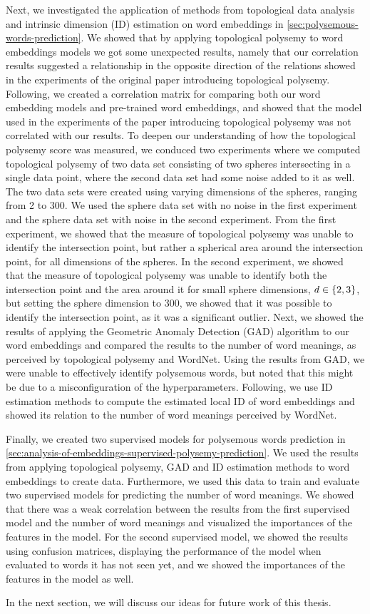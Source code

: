 Next, we investigated the application of methods from topological data analysis and intrinsic dimension (ID) estimation on word embeddings in \cref{sec:polysemous-words-prediction}. We showed that by applying topological polysemy to word embeddings models we got some unexpected results, namely that our correlation results suggested a relationship in the opposite direction of the relations showed in the experiments of the original paper introducing topological polysemy. Following, we created a correlation matrix for comparing both our word embedding models and pre-trained word embeddings, and showed that the model used in the experiments of the paper introducing topological polysemy was not correlated with our results. To deepen our understanding of how the topological polysemy score was measured, we conduced two experiments where we computed topological polysemy of two data set consisting of two spheres intersecting in a single data point, where the second data set had some noise added to it as well. The two data sets were created using varying dimensions of the spheres, ranging from 2 to 300. We used the sphere data set with no noise in the first experiment and the sphere data set with noise in the second experiment. From the first experiment, we showed that the measure of topological polysemy was unable to identify the intersection point, but rather a spherical area around the intersection point, for all dimensions of the spheres. In the second experiment, we showed that the measure of topological polysemy was unable to identify both the intersection point and the area around it for small sphere dimensions, $d \in \left\{2, 3\right\}$, but setting the sphere dimension to 300, we showed that it was possible to identify the intersection point, as it was a significant outlier. Next, we showed the results of applying the Geometric Anomaly Detection (GAD) algorithm to our word embeddings and compared the results to the number of word meanings, as perceived by topological polysemy and WordNet. Using the results from GAD, we were unable to effectively identify polysemous words, but noted that this might be due to a misconfiguration of the hyperparameters. Following, we use ID estimation methods to compute the estimated local ID of word embeddings and showed its relation to the number of word meanings perceived by WordNet.

Finally, we created two supervised models for polysemous words prediction in \cref{sec:analysis-of-embeddings-supervised-polysemy-prediction}. We used the results from applying topological polysemy, GAD and ID estimation methods to word embeddings to create data. Furthermore, we used this data to train and evaluate two supervised models for predicting the number of word meanings. We showed that there was a weak correlation between the results from the first supervised model and the number of word meanings and visualized the importances of the features in the model. For the second supervised model, we showed the results using confusion matrices, displaying the performance of the model when evaluated to words it has not seen yet, and we showed the importances of the features in the model as well.

In the next section, we will discuss our ideas for future work of this thesis.